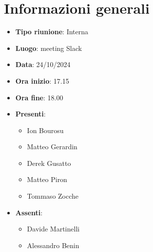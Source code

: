 \section{Informazioni generali}
\begin{itemize}
  \item \textbf{Tipo riunione}: Interna
  \item \textbf{Luogo}: meeting Slack
  \item \textbf{Data}: 24/10/2024
  \item \textbf{Ora inizio}: 17.15
  \item \textbf{Ora fine}: 18.00
  
  \item \textbf{Presenti}:
  \begin{itemize}
    \item Ion Bourosu
    \item Matteo Gerardin
    \item Derek Gusatto
    \item Matteo Piron
    \item Tommaso Zocche
            

  \end{itemize}

  \item \textbf{Assenti}:
   \begin{itemize}
  \item Davide Martinelli
  \item Alessandro Benin
  \end{itemize}
\end{itemize}